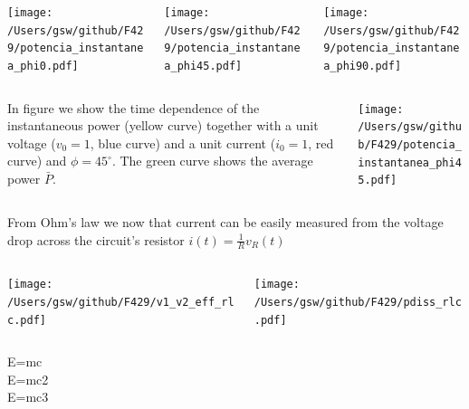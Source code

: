 \begin{frame}
\begin{columns}
	\begin{column}{0.33\textwidth}		
	\texttt{[image: /Users/gsw/github/F429/potencia\_instantanea\_phi0.pdf]}
	\end{column}
	\pause
	\begin{column}{0.33\textwidth}
	\texttt{[image: /Users/gsw/github/F429/potencia\_instantanea\_phi45.pdf]}
	\end{column}
	\pause
	\begin{column}{0.33\textwidth}
	\texttt{[image: /Users/gsw/github/F429/potencia\_instantanea\_phi90.pdf]}
	\end{column}
\end{columns}

\pause
	\begin{columns}
		\begin{column}{0.5\textwidth}
		In figure we show the time dependence of the instantaneous power (yellow curve) together with a unit voltage 	($v_0=1$, blue curve) and a unit current ($i_0=1$, red curve) and $\phi=45^{\circ}$. The green curve shows the 	average power $\bar{P}$. 
		\end{column}
		\begin{column}{0.5\textwidth}
			\texttt{[image: /Users/gsw/github/F429/potencia\_instantanea\_phi45.pdf]}
		\end{column}
	\end{columns}
From Ohm's law we now that current can be easily measured from the voltage drop across the circuit's resistor $i(t)=\frac{1}{R}v_R(t)$
\end{frame}
\begin{frame}
	\begin{columns}
		\begin{column}{0.5\textwidth}
			\texttt{[image: /Users/gsw/github/F429/v1\_v2\_eff\_rlc.pdf]}
		\end{column}
		\begin{column}{0.5\textwidth}
			\texttt{[image: /Users/gsw/github/F429/pdiss\_rlc.pdf]}
		\end{column}
	\end{columns}
\pause
    E=mc\\
    \pause
    E=mc2\\
    \pause
    E=mc3\\
\end{frame}




